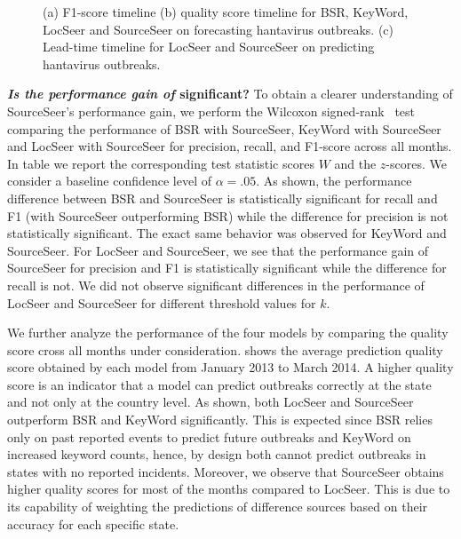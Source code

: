 \documentclass[twoside,leqno,twocolumn]{article}
\newcommand{\fullmodel}{{{\sf SourceSeer}}\xspace}
\newcommand{\locationmodel}{{\sf LocSeer}\xspace}
\newcommand{\keymodel}{{\sf KeyWord}\xspace}
\begin{document}
\begin{figure}[t]
\begin{center}
\end{center}
\caption{(a) F1-score timeline (b) quality score timeline for BSR, \keymodel, \locationmodel and \fullmodel on forecasting hantavirus outbreaks. (c) Lead-time timeline for \locationmodel and \fullmodel on predicting hantavirus outbreaks.}
\label{fig:perf_timelines}
\end{figure}


\noindent\textbf{{\em Is the performance gain of {}} significant?} To obtain a clearer understanding of \fullmodel's performance gain, we perform the Wilcoxon signed-rank~\cite{Wilcoxon45} test comparing the performance of  BSR with \fullmodel,  \keymodel with \fullmodel and \locationmodel with \fullmodel for precision, recall, and F1-score across all months. In table  we report the corresponding test statistic scores $W$ and the $z$-scores. We consider a baseline confidence level of $\alpha = .05$. As shown, the performance difference between BSR and \fullmodel is statistically significant for recall and F1 (with \fullmodel outperforming BSR) while the difference for precision is not statistically significant. The exact same behavior was observed for \keymodel and \fullmodel. For \locationmodel and \fullmodel, we see that the performance gain of \fullmodel for precision and F1 is statistically significant while the difference for recall is not. We did not observe significant differences in the performance of \locationmodel and \fullmodel for different threshold values for $k$. 

We further analyze the performance of the four models by comparing the quality score cross all months under consideration.  shows the average prediction quality score obtained by each model from January 2013 to March 2014. A higher quality score is an indicator that a model can predict outbreaks correctly at the state and not only at the country level. As shown, both \locationmodel and \fullmodel outperform BSR and \keymodel significantly. This is expected since BSR relies only on past reported events to predict future outbreaks and \keymodel on increased keyword counts, hence, by design both cannot predict outbreaks in states with no reported incidents. Moreover, we observe that \fullmodel obtains higher quality scores for most of the months compared to \locationmodel. This is due to its capability of weighting the predictions of difference sources  based on their accuracy for each specific state.
\end{document}
